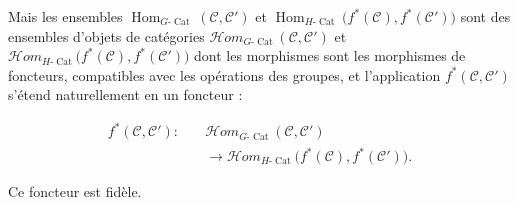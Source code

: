 Mais les ensembles
$\operatorname{Hom}_{G\text{-}\operatorname{Cat}}
(\mathcal C,\mathcal C')$ et
$\operatorname{Hom}_{H\text{-}\operatorname{Cat}}
\bigl(f^*(\mathcal C),f^*(\mathcal C')\bigr)$ sont des ensembles
d'objets de catégories
$\mathcal H\!om_{G\text{-}\operatorname{Cat}}
(\mathcal C,\mathcal C')$ et
$\mathcal H\!om_{H\text{-}\operatorname{Cat}}
\bigl(f^*(\mathcal C),f^*(\mathcal C')\bigr)$ dont les morphismes sont
les morphismes de foncteurs, compatibles avec les opérations des
groupes, et l'application $f^*(\mathcal C,\mathcal C')$ s'étend
naturellement en un foncteur :

\begin{equation}
  \begin{aligned}
    f^*(\mathcal C,\mathcal C')\colon\quad
      &\mathcal H\!om_{G\text{-}\operatorname{Cat}}
        (\mathcal C,\mathcal C')\\
      &\longrightarrow
        \mathcal H\!om_{H\text{-}\operatorname{Cat}}
        \bigl(f^*(\mathcal C),f^*(\mathcal C')\bigr).
  \end{aligned}
  \tag{1.4.1.5}
\end{equation}

Ce foncteur est fidèle.
